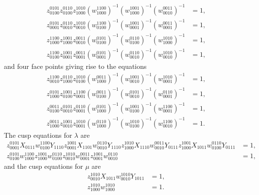\documentclass[12pt]{amsart}
\theoremstyle{definition}
\numberwithin{equation}{section}
\begin{document}
\begin{equation}
\begin{aligned}
z^{0101}_{0100}z^{0110}_{0100}z^{1010}_{1000}(w^{1100}_{1000})^{-1}(w^{1001}_{1000})^{-1}(w^{0011}_{0010})^{-1}&=1,\\
z^{0101}_{0001}z^{0110}_{0010}z^{1010}_{0010}(w^{1100}_{0100})^{-1}(w^{1001}_{0001})^{-1}(w^{0011}_{0001})^{-1}&=1,\\
z^{1100}_{1000}z^{1001}_{1000}z^{0011}_{0010}(w^{0101}_{0100})^{-1}(w^{0110}_{0100})^{-1}(w^{1010}_{1000})^{-1}&=1,\\
z^{1100}_{0100}z^{1001}_{0001}z^{0011}_{0001}(w^{0101}_{0001})^{-1}(w^{0110}_{0010})^{-1}(w^{1010}_{0010})^{-1}&=1,
\end{aligned}
\end{equation}
and four face points giving rise to the equations
\begin{equation}
\begin{aligned}
z^{1100}_{0010}z^{0110}_{1000}z^{1010}_{0100}(w^{0011}_{1000})^{-1}(w^{1001}_{0010})^{-1}(w^{1010}_{0001})^{-1}&=1,\\
z^{0101}_{1000}z^{1001}_{0100}z^{1100}_{0001}(w^{0011}_{0100})^{-1}(w^{0101}_{0010})^{-1}(w^{0110}_{0001})^{-1}&=1,\\
z^{0011}_{0100}z^{0101}_{0010}z^{0110}_{0001}(w^{0101}_{1000})^{-1}(w^{1001}_{0100})^{-1}(w^{1100}_{0001})^{-1}&=1,\\
z^{0011}_{1000}z^{1001}_{0010}z^{1010}_{0001}(w^{0110}_{1000})^{-1}(w^{1010}_{0100})^{-1}(w^{1100}_{0010})^{-1}&=1.
\end{aligned}
\end{equation}
The cusp equations for $\lambda$ are
\begin{equation}
\begin{aligned}
z^{0101}_{0001}X_{0111}w^{1100}_{0100}Y_{1110}z^{1001}_{0001}X_{1101}w^{0110}_{0010}Y_{1110}z^{1010}_{1000}X_{1110}w^{0011}_{0010}Y_{0111}z^{1001}_{1000}X_{1011}w^{0110}_{0100}Y_{0111}&=1,\\
z^{0101}_{0100}w^{1100}_{1000}z^{1001}_{1000}w^{0110}_{0100}z^{1010}_{0010}w^{0011}_{0001}z^{1001}_{0001}w^{0110}_{0010}&=1,
\end{aligned}
\end{equation}
and the cusp equations for $\mu$ are
\begin{equation}
\begin{aligned}
z^{1010}_{0010}X_{1011}w^{1010}_{0010}Y_{1011}&=1,\\
z^{1010}_{1000}w^{1010}_{1000}&=1.
\end{aligned}
\end{equation}
\end{document}
